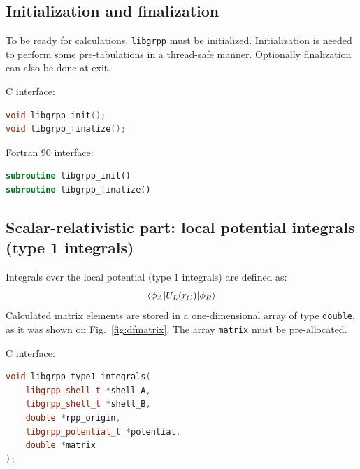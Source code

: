 \documentclass[12pt]{article}
\begin{document}
\subsection{Initialization and finalization}

To be ready for calculations, \texttt{libgrpp} must be initialized. Initialization is needed to perform some pre-tabulations in a thread-safe manner. Optionally finalization can also be done at exit.

C interface:
%
\begin{lstlisting}[language=C++]
void libgrpp_init();
void libgrpp_finalize();
\end{lstlisting}

Fortran 90 interface:
%
\begin{lstlisting}[language=Fortran]
subroutine libgrpp_init()
subroutine libgrpp_finalize()
\end{lstlisting}


\subsection{Scalar-relativistic part: local potential integrals (type 1 integrals)}
\label{sec:type1-integrals}

Integrals over the local potential (type 1 integrals) are defined as:
%
\begin{equation}
\braket{\phi_A|U_L(r_C)|\phi_B}
\label{eq:def-type1-ints}
\end{equation}
%
Calculated matrix elements are stored in a one-dimensional array of type \texttt{double}, as it was shown on Fig.~\ref{fig:dfmatrix}. The array \texttt{matrix} must be pre-allocated.

C interface:
%
\begin{lstlisting}[language=C++]
void libgrpp_type1_integrals(
    libgrpp_shell_t *shell_A,
    libgrpp_shell_t *shell_B,
    double *rpp_origin,
    libgrpp_potential_t *potential,
    double *matrix
);
\end{lstlisting}
\end{document}
